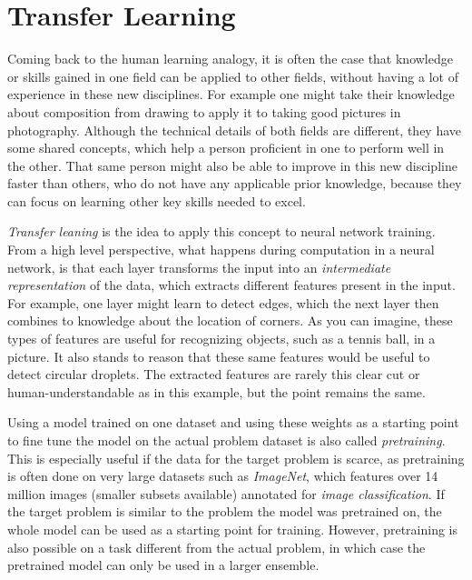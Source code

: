 \section{Transfer Learning}
\label{sec:transfer_learning}

Coming back to the human learning analogy, it is often the case that knowledge or skills gained in one field can be applied to other fields, without having a lot of experience in these new disciplines. For example one might take their knowledge about composition from drawing to apply it to taking good pictures in photography. Although the technical details of both fields are different, they have some shared concepts, which help a person proficient in one to perform well in the other. That same person might also be able to improve in this new discipline faster than others, who do not have any applicable prior knowledge, because they can focus on learning other key skills needed to excel.

\emph{Transfer leaning} is the idea to apply this concept to neural network training. From a high level perspective, what happens during computation in a neural network, is that each layer transforms the input into an \emph{intermediate representation} of the data, which extracts different features present in the input. For example, one layer might learn to detect edges, which the next layer then combines to knowledge about the location of corners. As you can imagine, these types of features are useful for recognizing objects, such as a tennis ball, in a picture. It also stands to reason that these same features would be useful to detect circular droplets. The extracted features are rarely this clear cut or human-understandable as in this example, but the point remains the same. 

Using a model trained on one dataset and using these weights as a starting point to fine tune the model on the actual problem dataset is also called \emph{pretraining}. This is especially useful if the data for the target problem is scarce, as pretraining is often done on very large datasets such as \emph{ImageNet}\cite{dengImageNetLargescaleHierarchical2009}, which features over 14 million images (smaller subsets available) annotated for \emph{image classification}.
If the target problem is similar to the problem the model was pretrained on, the whole model can be used as a starting point for training. 
However, pretraining is also possible on a task different from the actual problem, in which case the pretrained model can only be used in a larger ensemble.

